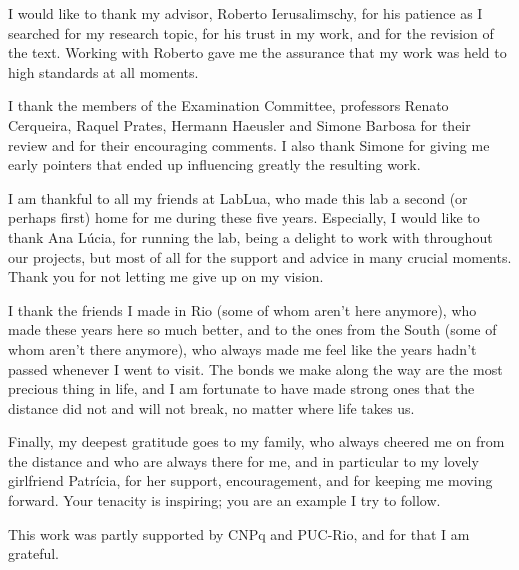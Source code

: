 I would like to thank my advisor, Roberto Ierusalimschy, for his patience as I
searched for my research topic, for his trust in my work, and for the
revision of the text. Working with Roberto gave me the assurance that my work
was held to high standards at all moments.

I thank the members of the Examination Committee, professors Renato Cerqueira,
Raquel Prates, Hermann Haeusler and Simone Barbosa for their review and for
their encouraging comments. I also thank Simone for giving me early pointers
that ended up influencing greatly the resulting work.

I am thankful to all my friends at LabLua, who made this lab a second (or
perhaps first) home for me during these five years. Especially, I would like
to thank Ana Lúcia, for running the lab, being a delight to work with
throughout our projects, but most of all for the support and advice
in many crucial moments. Thank you for not letting me give up on my vision.

I thank the friends I made in Rio (some of whom aren't here anymore), who made
these years here so much better, and to the ones from the South (some of whom
aren't there anymore), who always made me feel like the years hadn't passed
whenever I went to visit. The bonds we make along the way are the most
precious thing in life, and I am fortunate to have made strong ones that the
distance did not and will not break, no matter where life takes us.

Finally, my deepest gratitude goes to my family, who always cheered me on from
the distance and who are always there for me, and in particular to my lovely
girlfriend Patrícia, for her support, encouragement, and for keeping me moving
forward. Your tenacity is inspiring; you are an example I try to follow.

\bigskip 

This work was partly supported by CNPq and PUC-Rio, and for that I
am grateful.
